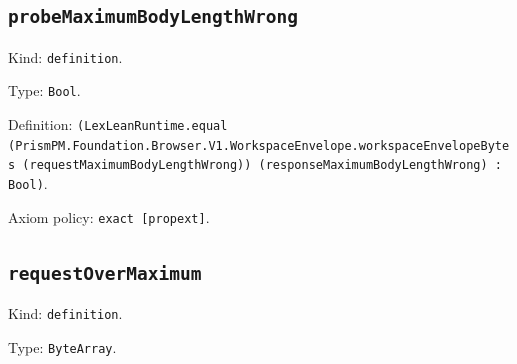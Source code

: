 \documentclass[11pt]{article}
\begin{document}
\subsection*{\texttt{probeMaximumBodyLengthWrong}}
\noindent Kind: \texttt{definition}.\par
\noindent Type: \texttt{Bool}.\par
\noindent Definition: \texttt{(LexLeanRuntime.equal (PrismPM.Foundation.Browser.V1.WorkspaceEnvelope.workspaceEnvelopeBytes (requestMaximumBodyLengthWrong)) (responseMaximumBodyLengthWrong) : Bool)}.\par
\noindent Axiom policy: \texttt{exact [propext]}.\par
\subsection*{\texttt{requestOverMaximum}}
\noindent Kind: \texttt{definition}.\par
\noindent Type: \texttt{ByteArray}.\par
\end{document}

